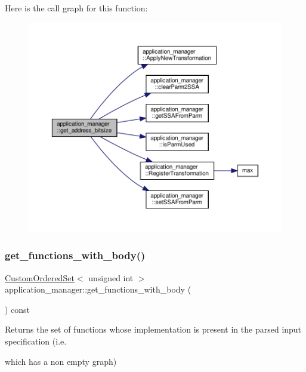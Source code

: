 Here is the call graph for this function\+:
\nopagebreak
\begin{figure}[H]
\begin{center}
\leavevmode
\includegraphics[width=350pt]{dc/db5/classapplication__manager_a1edba5434f8e815cf9339be509af0d52_cgraph}
\end{center}
\end{figure}
\mbox{\label{classapplication__manager_a8bb1664d61f349e809e4e2efee672457}} 
\subsubsection{\texorpdfstring{get\+\_\+functions\+\_\+with\+\_\+body()}{get\_functions\_with\_body()}}
{\footnotesize\ttfamily \hyperlink{classCustomOrderedSet}{Custom\+Ordered\+Set}$<$ unsigned int $>$ application\+\_\+manager\+::get\+\_\+functions\+\_\+with\+\_\+body (\begin{DoxyParamCaption}{ }\end{DoxyParamCaption}) const}



Returns the set of functions whose implementation is present in the parsed input specification (i.\+e. 

which has a non empty graph) 

